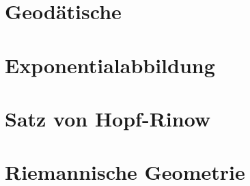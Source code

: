 \documentclass[10pt, letterpaper]{article}
\begin{document}
\section{Geodätische}






\section{Exponentialabbildung}






\section{Satz von Hopf-Rinow}






\section{Riemannische Geometrie}




\pagebreak
\printbibliography
\end{document}
